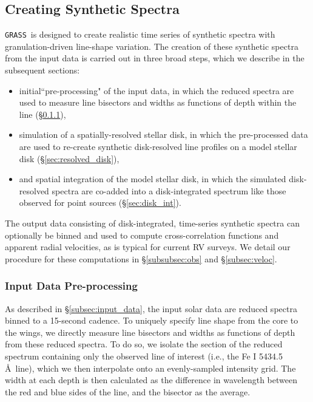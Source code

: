 \documentclass[twocolumn]{aastex63}
\newcommand{\grass}{\texttt{GRASS}}
\newcommand{\revise}[1]{#1}
\begin{document}
\subsection{Creating Synthetic Spectra} \label{subsec:create}
\grass\ is designed to create realistic time series of synthetic spectra with granulation-driven line-shape variation. The creation of these synthetic spectra from the input data is carried out in three broad steps, which we describe in the subsequent sections:

\begin{itemize}
    \item initial``pre-processing" of the input data, in which the reduced spectra are used to \revise{measure line bisectors and widths} as functions of depth within the line (\S \ref{subsubsec:preprocess}),
    \item simulation of a spatially-resolved stellar disk, in which the pre-processed data are used to re-create synthetic disk-resolved line profiles on a model stellar disk (\S\ref{sec:resolved_disk}),
    \item and spatial integration of the model stellar disk, in which the simulated disk-resolved spectra are co-added into a disk-integrated spectrum like those observed for point sources (\S\ref{sec:disk_int}).
\end{itemize}

The output data consisting of disk-integrated, time-series synthetic spectra can optionally be binned and used to compute cross-correlation functions and apparent radial velocities, as is typical for current RV surveys. We detail our procedure for these computations in \S\ref{subsubsec:obs} and \S\ref{subsec:veloc}. \par 

\subsubsection{Input Data Pre-processing}
\label{subsubsec:preprocess}

% 

As described in \S\ref{subsec:input_data}, the input solar data are reduced spectra binned to a 15-second cadence. To uniquely specify line shape from the core to the wings, we directly measure line bisectors and widths as functions of depth from these reduced spectra. To do so, we isolate the section of the reduced spectrum containing only the observed line of interest (i.e., the Fe \textsc{I} 5434.5 \AA\ line), which we then interpolate onto an evenly-sampled intensity grid. The width at each depth is then calculated as the difference in wavelength between the red and blue sides of the line, and the bisector as the average. \par
\end{document}
